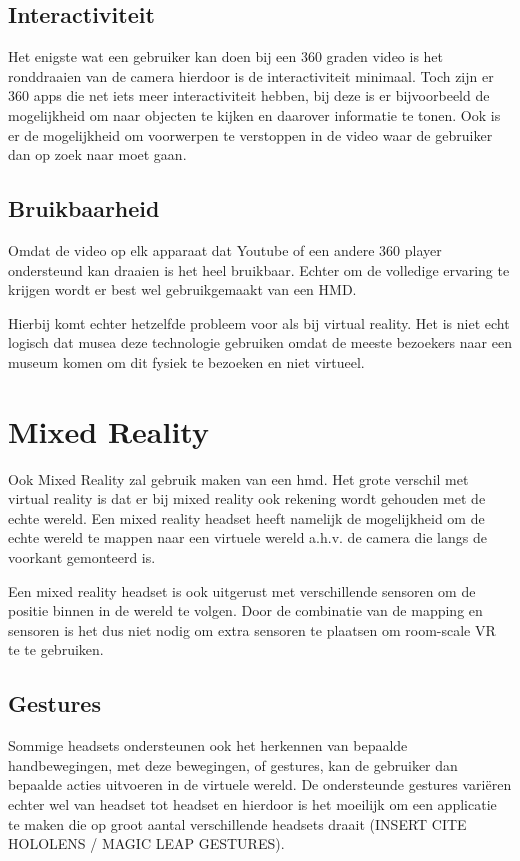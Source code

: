 \subsection{Interactiviteit}
Het enigste wat een gebruiker kan doen bij een 360 graden video is het ronddraaien van de camera hierdoor is de interactiviteit minimaal. Toch zijn er 360 apps die net iets meer interactiviteit hebben, bij deze is er bijvoorbeeld de mogelijkheid om naar objecten te kijken en daarover informatie te tonen. Ook is er de mogelijkheid om voorwerpen te verstoppen in de video waar de gebruiker dan op zoek naar moet gaan.
\subsection{Bruikbaarheid}
Omdat de video op elk apparaat dat Youtube of een andere 360 player ondersteund kan draaien is het heel bruikbaar. Echter om de volledige ervaring te krijgen wordt er best wel gebruikgemaakt van een HMD.

Hierbij komt echter hetzelfde probleem voor als bij virtual reality. Het is niet echt logisch dat musea deze technologie gebruiken omdat de meeste bezoekers naar een museum komen om dit fysiek te bezoeken en niet virtueel.

\section{Mixed Reality} \label{sec:mixedreality}
Ook Mixed Reality zal gebruik maken van een \acrshort{hmd}. Het grote verschil met virtual reality is dat er bij mixed reality ook rekening wordt gehouden met de echte wereld. Een mixed reality headset heeft namelijk de mogelijkheid om de echte wereld te mappen naar een virtuele wereld a.h.v. de camera die langs de voorkant gemonteerd is.

Een mixed reality headset is ook uitgerust met verschillende sensoren om de positie binnen in de wereld te volgen. Door de combinatie van de mapping en sensoren is het dus niet nodig om extra sensoren te plaatsen om room-scale VR te te gebruiken.

\subsection{Gestures}
Sommige headsets ondersteunen ook het herkennen van bepaalde handbewegingen, met deze bewegingen, of gestures, kan de gebruiker dan bepaalde acties uitvoeren in de virtuele wereld. De ondersteunde gestures variëren echter wel van headset tot headset en hierdoor is het moeilijk om een applicatie te maken die op groot aantal verschillende headsets draait (INSERT CITE HOLOLENS / MAGIC LEAP GESTURES).

